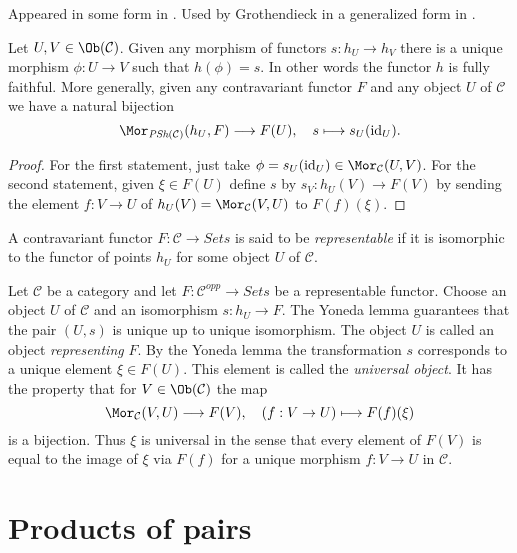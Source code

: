 \begin{lemma}
\label{lemma-yoneda}
\begin{reference}
Appeared in some form in \cite{Yoneda-homology}. Used by Grothendieck in a
generalized form in \cite{Gr-II}.
\end{reference}
Let $U, V \in \Ob(\mathcal{C})$.
Given any morphism of functors $s : h_U \to h_V$
there is a unique morphism $\phi : U \to V$
such that $h(\phi) = s$. In other words the
functor $h$ is fully faithful. More generally,
given any contravariant functor $F$ and any object
$U$ of $\mathcal{C}$ we have a natural bijection
$$
\Mor_{\textit{PSh}(\mathcal{C})}(h_U, F) \longrightarrow F(U),
\quad
s \longmapsto s_U(\text{id}_U).
$$
\end{lemma}

\begin{proof}
For the first statement, just take
$\phi = s_U(\text{id}_U) \in \Mor_\mathcal{C}(U, V)$.
For the second statement, given $\xi \in F(U)$ define
$s$ by $s_V : h_U(V) \to F(V)$ by sending the element $f : V \to U$
of $h_U(V) = \Mor_\mathcal{C}(V, U)$ to $F(f)(\xi)$.
\end{proof}

\begin{definition}
\label{definition-representable-functor}
A contravariant functor $F : \mathcal{C}\to \textit{Sets}$ is said
to be {\it representable} if it is isomorphic to the functor of
points $h_U$ for some object $U$ of $\mathcal{C}$.
\end{definition}

\noindent
Let $\mathcal{C}$ be a category and let
$F : \mathcal{C}^{opp} \to \textit{Sets}$ be a representable functor.
Choose an object $U$ of $\mathcal{C}$ and an isomorphism $s : h_U \to F$.
The Yoneda lemma guarantees that the pair $(U, s)$
is unique up to unique isomorphism. The object
$U$ is called an object {\it representing} $F$.
By the Yoneda lemma the transformation $s$ corresponds to a unique
element $\xi \in F(U)$. This element is called the {\it universal object}.
It has the property that for $V \in \Ob(\mathcal{C})$ the map
$$
\Mor_\mathcal{C}(V, U) \longrightarrow F(V),\quad
(f : V \to U) \longmapsto F(f)(\xi)
$$
is a bijection. Thus $\xi$ is universal in the sense that every element
of $F(V)$ is equal to the image of $\xi$ via $F(f)$ for a unique morphism
$f : V \to U$ in $\mathcal{C}$.






\section{Products of pairs}
\label{section-products-pairs}

